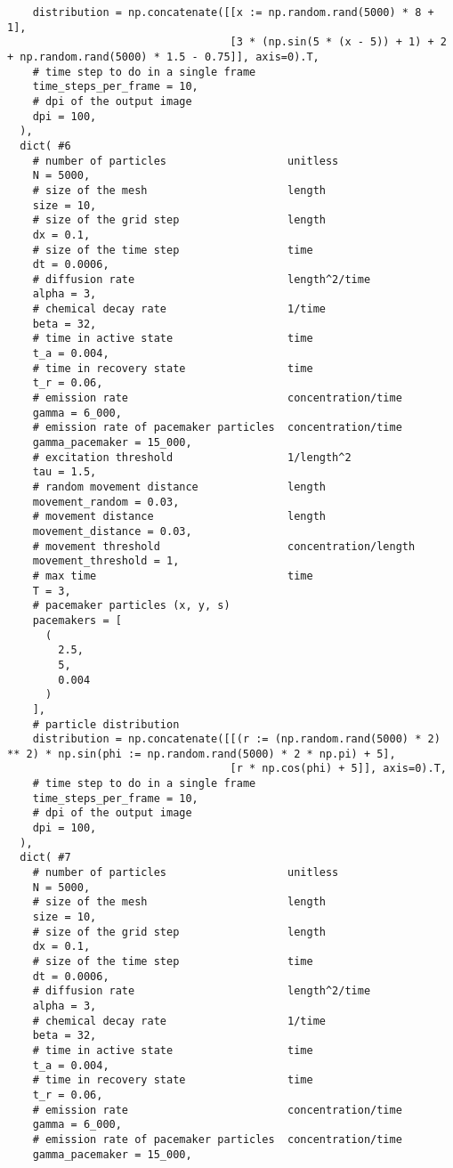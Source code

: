 \begin{verbatim}
    distribution = np.concatenate([[x := np.random.rand(5000) * 8 + 1],
                                   [3 * (np.sin(5 * (x - 5)) + 1) + 2 + np.random.rand(5000) * 1.5 - 0.75]], axis=0).T,
    # time step to do in a single frame
    time_steps_per_frame = 10,
    # dpi of the output image
    dpi = 100,
  ),
  dict( #6
    # number of particles                   unitless
    N = 5000,
    # size of the mesh                      length
    size = 10,
    # size of the grid step                 length
    dx = 0.1,
    # size of the time step                 time
    dt = 0.0006,
    # diffusion rate                        length^2/time
    alpha = 3,
    # chemical decay rate                   1/time
    beta = 32,
    # time in active state                  time
    t_a = 0.004,
    # time in recovery state                time
    t_r = 0.06,
    # emission rate                         concentration/time
    gamma = 6_000,
    # emission rate of pacemaker particles  concentration/time
    gamma_pacemaker = 15_000,
    # excitation threshold                  1/length^2
    tau = 1.5,
    # random movement distance              length
    movement_random = 0.03,
    # movement distance                     length
    movement_distance = 0.03,
    # movement threshold                    concentration/length
    movement_threshold = 1,
    # max time                              time
    T = 3,
    # pacemaker particles (x, y, s)
    pacemakers = [
      (
        2.5,
        5,
        0.004
      )
    ],
    # particle distribution
    distribution = np.concatenate([[(r := (np.random.rand(5000) * 2) ** 2) * np.sin(phi := np.random.rand(5000) * 2 * np.pi) + 5],
                                   [r * np.cos(phi) + 5]], axis=0).T,
    # time step to do in a single frame
    time_steps_per_frame = 10,
    # dpi of the output image
    dpi = 100,
  ),
  dict( #7
    # number of particles                   unitless
    N = 5000,
    # size of the mesh                      length
    size = 10,
    # size of the grid step                 length
    dx = 0.1,
    # size of the time step                 time
    dt = 0.0006,
    # diffusion rate                        length^2/time
    alpha = 3,
    # chemical decay rate                   1/time
    beta = 32,
    # time in active state                  time
    t_a = 0.004,
    # time in recovery state                time
    t_r = 0.06,
    # emission rate                         concentration/time
    gamma = 6_000,
    # emission rate of pacemaker particles  concentration/time
    gamma_pacemaker = 15_000,

\end{verbatim}

